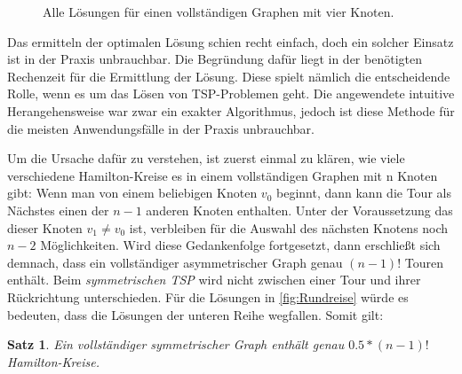 \documentclass{article}
\newtheorem{mysat}{Satz}
\begin{document}
\begin{figure}[!h]
\begin{subfigure}{0.3\linewidth}
	\end{subfigure}
	\begin{subfigure}{0.3\linewidth}
		\centering
	\end{subfigure}
	\caption{Alle Lösungen für einen vollständigen Graphen mit vier Knoten.}
	\label{fig:Rundreise}
\end{figure}
\newpage
Das ermitteln der optimalen Lösung schien recht einfach, doch ein solcher Einsatz ist in der Praxis unbrauchbar. Die Begründung dafür liegt in der benötigten Rechenzeit für die Ermittlung der Lösung. Diese spielt nämlich die entscheidende Rolle, wenn es um das Lösen von TSP-Problemen geht. Die angewendete intuitive Herangehensweise war zwar ein exakter Algorithmus, jedoch ist diese Methode für die meisten Anwendungsfälle in der Praxis unbrauchbar. 
\par Um die Ursache dafür zu verstehen, ist zuerst einmal zu klären, wie viele verschiedene Hamilton-Kreise es in einem vollständigen Graphen mit n Knoten gibt: Wenn man von einem beliebigen Knoten $v_0$ beginnt, dann kann die Tour als Nächstes einen der $n - 1$ anderen Knoten enthalten. Unter der Voraussetzung das dieser Knoten $v_1 \neq v_0$ ist, verbleiben für die Auswahl des nächsten Knotens noch $n - 2$ Möglichkeiten. Wird diese Gedankenfolge fortgesetzt, dann erschließt sich demnach, dass ein vollständiger asymmetrischer Graph genau $(n - 1)!$ Touren enthält. Beim \textit{symmetrischen TSP} wird nicht zwischen einer Tour und ihrer Rückrichtung unterschieden. Für die Lösungen in \autoref{fig:Rundreise} würde es bedeuten, dass die Lösungen der unteren Reihe wegfallen. Somit gilt:

\begin{mysat}
	Ein vollständiger symmetrischer Graph enthält genau $0.5 * ( n - 1)!$ Hamilton-Kreise.
\end{mysat}
\end{document}
